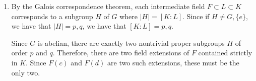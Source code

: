 \documentclass[12pt]{AlgebraQual}
\begin{document}
\begin{solution}
\begin{enumerate}[label=(\alph*)]
\begin{comment}
    Also

    Thus, in this case, $n_p=n_q=1$ so $$G\cong \mathbb{Z}_{pq}.$$


    If $p|(q-1)$, and $n_p=q-1$, then because $n_q=1$, by the recognizing semi-direct products theorem, we have that $G\cong \mathbb{Z}_q\rtimes_\varphi\mathbb{Z}_p$ for some $\varphi.$

    Let $\varphi:\mathbb{Z}_p\to\aut(\mathbb{Z}_q)\cong\mathbb{Z}_{q-1}.$

    Then if $\mathbb{Z}_p=\langle x\rangle$, and $\mathbb{Z}_q=\langle y\rangle$, then let $y\mapsto y^t$ be a non-trivial element of $\aut(\mathbb{Z}_q)$ of order $p$ (which exists since $p|(q-1)$. Then $\varphi$ defines multiplication by $xyx^{-1}=\varphi(x)(y)=y^t$. This gives the semi-direct product structure of $G$ as $$G\cong\langle x,y\,|\,x^p=y^q=1,xyx^{-1}=y^t\rangle.$$

    Furthermore, since for any other map $\sigma\in\aut(\mathbb{Z}_q)$ with $\sigma(y)=y^s$ having order $p$ there exists some map $\tau\in\aut(\mathbb{Z}_q)$ such that $\tau\sigma\tau^{-1}(y)=y^t$. Namely, all other possible structures for $G$ as a semi-direct prduct will be isomorphic.
\end{comment}

    \item By the Galois correspondence theorem, each intermediate field $F\subset L\subset K$ corresponds to a subgroup $H$ of $G$ where $|H|=[K:L].$ Since if $H\not=G,\{e\}$, we have that $|H|=p,q$, we have that $[K:L]=p,q.$

    Since $G$ is abelian, there are exactly two nontrivial proper subgroups $H$ of order $p$ and $q.$ Therefore, there are two field extensions of $F$ contained strictly in $K$. Since $F(c)$ and $F(d)$ are two such extensions, these must be the only two.
\end{enumerate}
\end{solution}
\newpage
\end{document}
